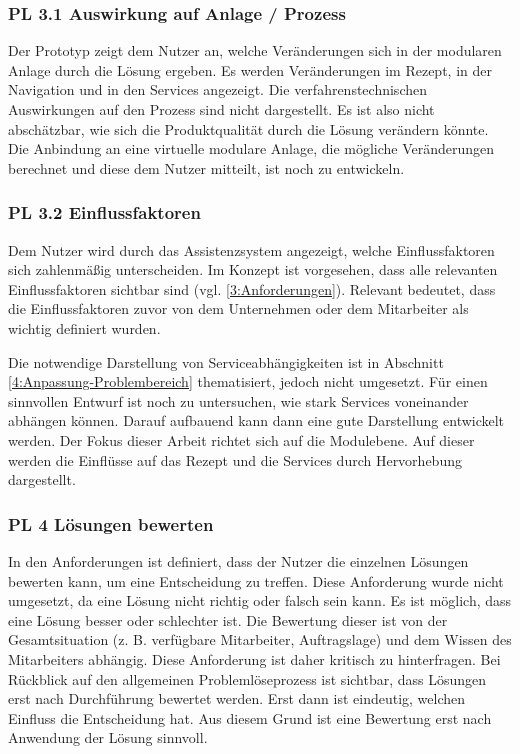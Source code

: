 \subsubsection*{PL 3.1 Auswirkung auf Anlage / Prozess}
Der Prototyp zeigt dem Nutzer an, welche Veränderungen sich in der modularen Anlage durch die Lösung ergeben. Es werden Veränderungen im Rezept, in der Navigation und in den Services angezeigt. Die verfahrenstechnischen Auswirkungen auf den Prozess sind nicht dargestellt. Es ist also nicht abschätzbar, wie sich die Produktqualität durch die Lösung verändern könnte. Die Anbindung an eine virtuelle modulare Anlage, die mögliche Veränderungen berechnet und diese dem Nutzer mitteilt, ist noch zu entwickeln.

\subsubsection*{PL 3.2 Einflussfaktoren}
Dem Nutzer wird durch das Assistenzsystem angezeigt, welche Einflussfaktoren sich zahlenmäßig unterscheiden. Im Konzept ist vorgesehen, dass alle relevanten Einflussfaktoren sichtbar sind (vgl. \ref{3:Anforderungen}). Relevant bedeutet, dass die Einflussfaktoren zuvor von dem Unternehmen oder dem Mitarbeiter als wichtig definiert wurden.

Die notwendige Darstellung von Serviceabhängigkeiten ist in Abschnitt \ref{4:Anpassung-Problembereich} thematisiert, jedoch nicht umgesetzt. Für einen sinnvollen Entwurf ist noch zu untersuchen, wie stark Services voneinander abhängen können. Darauf aufbauend kann dann eine gute Darstellung entwickelt werden. Der Fokus dieser Arbeit richtet sich auf die Modulebene. Auf dieser werden die Einflüsse auf das Rezept und die Services durch Hervorhebung dargestellt.

\subsubsection*{PL 4 Lösungen bewerten}
In den Anforderungen ist definiert, dass der Nutzer die einzelnen Lösungen bewerten kann, um eine Entscheidung zu treffen. Diese Anforderung wurde nicht umgesetzt, da eine Lösung nicht richtig oder falsch sein kann. Es ist möglich, dass eine Lösung besser oder schlechter ist. Die Bewertung dieser ist von der Gesamtsituation (z. B. verfügbare Mitarbeiter, Auftragslage) und dem Wissen des Mitarbeiters abhängig. Diese Anforderung ist daher kritisch zu hinterfragen. Bei Rückblick auf den allgemeinen Problemlöseprozess ist sichtbar, dass Lösungen erst nach Durchführung bewertet werden. Erst dann ist eindeutig, welchen Einfluss die Entscheidung hat. Aus diesem Grund ist eine Bewertung erst nach Anwendung der Lösung sinnvoll.

